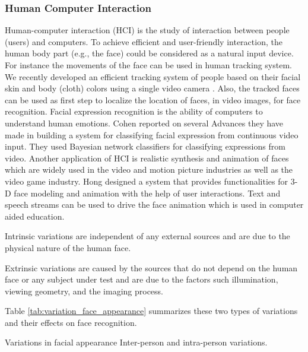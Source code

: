 \subsubsection{Human Computer Interaction}
Human-computer interaction (HCI) is the study of interaction between
people (users) and computers. To achieve efficient and user-friendly
interaction, the human body part (e.g., the face) could be
considered as a natural input device. For instance the movements of
the face can be used in human tracking system. We recently developed
an efficient tracking system of people based on their facial skin
and body (cloth) colors using a single video camera \cite{Charay05}.
Also, the tracked faces can be used as first step to localize the
location of faces, in video images, for face recognition. Facial
expression recognition is the ability of computers to understand
human emotions. Cohen \etal \cite{Cohen03} reported on several
Advances they have made in building a system for classifying facial
expression from continuous video input. They used Bayesian network
classifiers for classifying expressions from video. Another
application of HCI is realistic synthesis and animation of faces
which are widely used in the video and motion picture industries as
well as the video game industry. Hong \etal \cite{Hong02} designed a
system that provides functionalities for 3-D face modeling and
animation with the help of user interactions. Text and speech
streams can be used to drive the face animation which is used in
computer aided education.

\bi \item Intrinsic variations are independent of any external
sources and are due to the physical nature of the human face.
\item Extrinsic variations are caused by the sources that do not depend on the human
face or any subject under test and are due to the factors such
illumination, viewing geometry, and the imaging process. \ei

Table \ref{tab:variation_face_appearance} summarizes these two types
of variations and their effects on face recognition.

 \caption{Variations in facial appearance Inter-person
and intra-person variations.} \label{tab:variation_face_appearance}
\etable

